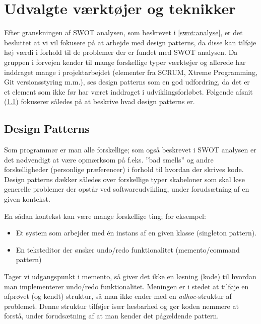 \section{Udvalgte værktøjer og teknikker}
Efter granskningen af SWOT analysen, som beskrevet i \cref{swot:analyse}, er det besluttet at vi vil fokusere på at arbejde med design patterns, da disse kan tilføje høj værdi i forhold til de problemer der er fundet med SWOT analysen.
Da gruppen i forvejen kender til mange forskellige typer værktøjer og allerede har inddraget mange i projektarbejdet (elementer fra SCRUM, Xtreme Programming, Git versionsstyring m.m.), ses design patterns som en god udfordring, da det er et element som ikke før har været inddraget i udviklingsforløbet.
Følgende afsnit (\cref{design_patterns_beskrivelse}) fokuserer således på at beskrive hvad design patterns er.

\subsection{Design Patterns}\label{design_patterns_beskrivelse}
Som programmør er man alle forskellige; som også beskrevet i SWOT analysen er det nødvendigt at være opmærksom på f.eks. ''bad smells'' og andre forskelligheder (personlige præferencer) i forhold til hvordan der skrives kode.
Design patterns dækker således over forskellige typer skabeloner som skal løse generelle problemer der opstår ved softwareudvikling, under forudsætning af en given kontekst.

En sådan kontekst kan være mange forskellige ting; for eksempel:

\begin{itemize}
\item Et system som arbejder med én instans af en given klasse (singleton pattern).
\item En teksteditor der ønsker undo/redo funktionalitet (memento/command pattern)
\end{itemize}

Tager vi udgangspunkt i memento, så giver det ikke en løsning (kode) til hvordan man implementerer undo/redo funktionalitet.
Meningen er i stedet at tilføje en afprøvet (og kendt) struktur, så man ikke ender med en \textit{adhoc}-struktur af problemet.
Denne struktur tilføjer især læsbarhed og gør koden nemmere at forstå, under forudsætning af at man kender det pågældende pattern.